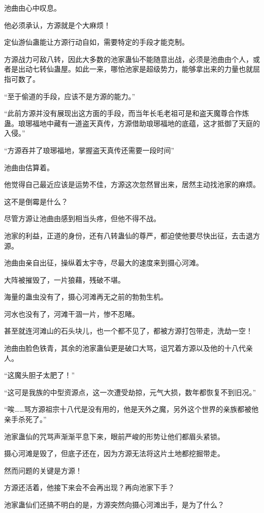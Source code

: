 \begin{this_body}
池曲由心中叹息。

他必须承认，方源就是个大麻烦！

定仙游仙蛊能让方源行动自如，需要特定的手段才能克制。

方源战力可敌八转，因此大多数的池家蛊仙不能随意出战，必须是池曲由个人，或者是出动七转仙蛊屋。如此一来，哪怕池家是超级势力，能够拿出来的力量也就屈指可数了。

“至于偷道的手段，应该不是方源的能力。”

“此前方源并没有展现出这方面的手段，而当年长毛老祖可是和盗天魔尊合作炼蛊。琅琊福地中藏有一道盗天真传，方源借助琅琊福地的底蕴，这才抵御了天庭的入侵。”

“方源吞并了琅琊福地，掌握盗天真传还需要一段时间”

池曲由估算着。

他觉得自己最近应该是运势不佳，方源这次忽然冒出来，居然主动找池家的麻烦。

这不是倒霉是什么？

尽管方源让池曲由感到相当头疼，但他不得不战。

池家的利益，正道的身份，还有八转蛊仙的尊严，都迫使他要尽快出征，去击退方源。

池曲由亲自出征，操纵着太宇寺，尽最大的速度来到摄心河滩。

大阵被摧毁了，一片狼藉，残破不堪。

海量的蛊虫没有了，摄心河滩再无之前的勃勃生机。

河水也没有了，河滩干涸一片，惨不忍睹。

甚至就连河滩山的石头块儿，也一个都不见了，都被方源打包带走，洗劫一空！

池曲由脸色铁青，其余的池家蛊仙更是破口大骂，诅咒着方源以及他的十八代亲人。

“这魔头胆子太肥了！”

“这可是我族的中型资源点，这一次遭受劫掠，元气大损，数年都恢复不到旧况。”

“唉……骂方源祖宗十八代是没有用的，他是天外之魔，另外这个世界的亲族都被他亲手杀死了。”

池家蛊仙的咒骂声渐渐平息下来，眼前严峻的形势让他们都眉头紧锁。

摄心河滩是毁了，但底子还在，因为方源无法将这片土地都挖掘带走。

然而问题的关键是方源！

方源还活着，他接下来会不会再出现？再向池家下手？

池家蛊仙们还搞不明白的是，方源突然向摄心河滩出手，是为了什么？


\end{this_body}

